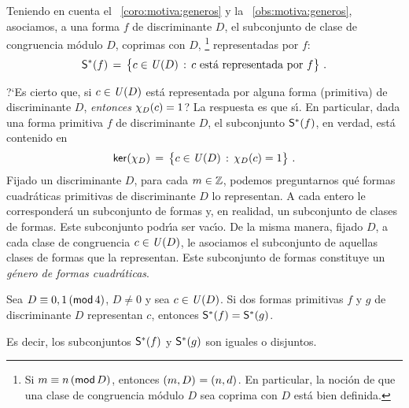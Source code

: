 Teniendo en cuenta el \coroname~\ref{coro:motiva:generos}
y la \obsname~\ref{obs:motiva:generos}, asociamos, a una
forma $f$ de discriminante $D$, el subconjunto de clase
de congruencia m\'odulo $D$, coprimas con $D$,%
\footnote{
	Si $m\equiv n\tmodulo[D]$, entonces
	$\mcd{m,D}=\mcd{n,d}$. En particular,
	la noci\'on de que una clase de congruencia
	m\'odulo $D$ sea coprima con $D$ est\'a bien
	definida.
}
representadas por $f$:
\begin{displaymath}
	\copRepresentados(f)\,=\,
		\big\{c\in\Unidadesmod(D)\,:\,
		c\text{ est\'a representada por } f\big\}
	\dispstop
\end{displaymath}
%

?`Es cierto que, si $c\in\Unidadesmod(D)$ est\'a representada
por alguna forma (primitiva) de discriminante $D$,
\emph{entonces} $\varkronecker[D](c)=1$?
La respuesta es que s\'{\i}.
En particular, dada una forma primitiva $f$ de discriminante
$D$, el subconjunto $\copRepresentados(f)$, en verdad, est\'a
contenido en
\begin{displaymath}
	\ker(\varkronecker[D])\,=\,
		\big\{c\in\Unidadesmod(D)\,:\,
		\varkronecker[D](c)=1\big\}
	\dispstop
\end{displaymath}
%
Fijado un discriminante $D$,
para cada $m\in\Enteros$, podemos preguntarnos qu\'e
formas cuadr\'aticas
primitivas de discriminante $D$ lo representan.
A cada entero le corresponder\'a un subconjunto de formas y,
en realidad, un subconjunto de clases de formas.
Este subconjunto podr\'{\i}a ser vac\'{\i}o.
De la misma manera, fijado $D$, a cada clase de congruencia
$c\in\Unidadesmod(D)$, le asociamos el subconjunto de aquellas
clases de formas que la representan. Este subconjunto de
formas constituye un \emph{g\'enero de formas cuadr\'aticas}.

\begin{teoMotivaGeneros}\label{teo:motiva:generos:bis}
	Sea $D\equiv 0,1\tmodulo[4]$, $D\neq 0$ y sea
	$c\in\Unidadesmod(D)$. Si dos formas primitivas
	$f$ y $g$ de discriminante $D$ representan $c$,
	entonces $\copRepresentados(f)=\copRepresentados(g)$.
\end{teoMotivaGeneros}

Es decir, los subconjuntos $\copRepresentados(f)$ y
$\copRepresentados(g)$ son iguales o disjuntos.

